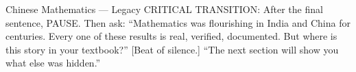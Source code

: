\begin{frame}[shrink=25]{Chinese Mathematics --- Legacy}
{    CRITICAL TRANSITION: After the final sentence, PAUSE. Then ask: ``Mathematics
    was flourishing in India and China for centuries. Every one of these results
    is real, verified, documented. But where is this story in your textbook?''
    [Beat of silence.] ``The next section will show you what else was hidden.''
  }
\end{frame}

